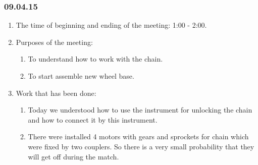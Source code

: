 \subsubsection{09.04.15}
\begin{enumerate}
	
	\item The time of beginning and ending of the meeting: 1:00 - 2:00.
	
	\item Purposes of the meeting: 
	\begin{enumerate}
		
		\item To understand how to work with the chain.
		
		\item To start assemble new wheel base.
		
	\end{enumerate}
	
	\item Work that has been done:
	\begin{enumerate}
		
		\item Today we understood how to use the instrument for unlocking the chain and how to connect it by this instrument.
		
		\item There were installed 4 motors with gears and sprockets for chain which were fixed by two couplers. So there is a very small probability that they will get off during the match.
		\begin{figure}[H]
			\begin{minipage}[h]{0.2\linewidth}
				\center  
			\end{minipage}
			\begin{minipage}[h]{0.6\linewidth}
				\caption{}
			\end{minipage}
		\end{figure}
		

\end{enumerate}
\end{enumerate}
